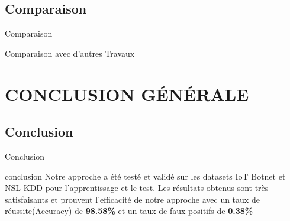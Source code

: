 \documentclass[aspectratio=169,professionalfonts, 12pt]{beamer}
\begin{document}
\subsection{Comparaison}
\begin{frame}{Comparaison}
	\begin{block}{Comparaison avec d'autres Travaux}
	\end{block}
\end{frame}
\section{CONCLUSION G\'EN\'ERALE}
\subsection{Conclusion}
\begin{frame}{Conclusion}
\begin{block}{conclusion}
Notre approche a été testé et validé sur les datasets IoT Botnet
et NSL-KDD pour l’apprentissage et le test. Les résultats obtenus sont très satisfaisants et prouvent l’efficacité de notre approche avec un taux de réussite(Accuracy) de \textbf{98.58\% } et un taux de faux positifs de \textbf{0.38\%}
\end{block}
\end{frame}
\end{document}
